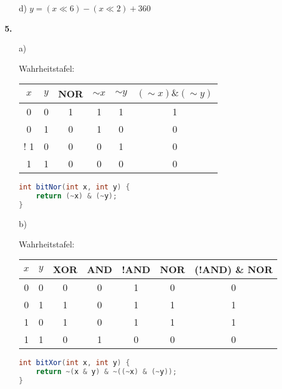\documentclass[a4paper,10pt]{scrartcl}
\begin{document}
\begin{enumerate}
\begin{enumerate}
            \item[d)]
                $y = (x \ll 6) - (x \ll 2) + 360$
        \end{enumerate}

    \item[\textbf{5.}]
        \begin{enumerate}
            \item[a)]

                Wahrheitstafel:

                \begin{tabular}{c|c||c|c|c|c}
                    $x$ & $y$ & NOR & $\sim x$ & $\sim y$ & $(\sim x) \& (\sim y)$\\
                    \hline
                    \hline
                    0 & 0 &  1  &  1 &  1 &      1\\
                    0 & 1 &  0  &  1 &  0 &      0\\!
                    1 & 0 &  0  &  0 &  1 &      0\\
                    1 & 1 &  0  &  0 &  0 &      0\\
                \end{tabular}

                \begin{lstlisting}[language=java]
int bitNor(int x, int y) {
    return (~x) & (~y);
}
                \end{lstlisting}

            \item[b)]

                Wahrheitstafel:

                \begin{tabular}{c|c||c|c|c|c|c}
                    $x$ & $y$ & XOR & AND & !AND & NOR & (!AND) \& NOR \\
                    \hline
                    \hline
                    0 & 0 &  0  &  0 &  1 & 0 & 0\\
                    0 & 1 &  1  &  0 &  1 & 1 & 1\\
                    1 & 0 &  1  &  0 &  1 & 1 & 1\\
                    1 & 1 &  0  &  1 &  0 & 0 & 0
                \end{tabular}

                \begin{lstlisting}[language=java]
int bitXor(int x, int y) {
    return ~(x & y) & ~((~x) & (~y));
}
                \end{lstlisting}



\end{enumerate}
\end{enumerate}
\end{document}
